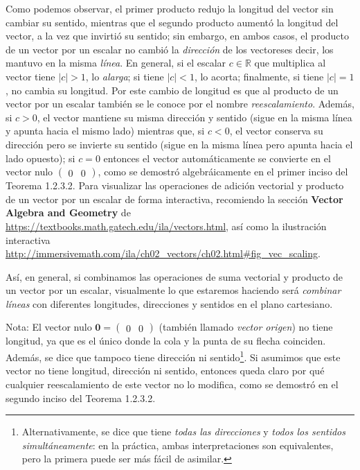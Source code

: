 \documentclass[12pt,dvipsnames]{article}
\begin{document}
    Como podemos observar, el primer producto redujo la longitud del vector sin cambiar su sentido, mientras que el segundo producto aumentó la longitud del vector, a la vez que invirtió su sentido; sin embargo, en ambos casos, el producto de un vector por un escalar no cambió la \emph{dirección} de los vectores\textemdash es decir, los mantuvo en la misma \emph{línea}. En general, si el escalar $c\in\mathbb{R}$ que multiplica al vector tiene $|c|>1$, lo \emph{alarga}; si tiene $|c|<1$, lo acorta; finalmente, si tiene $|c|=1$, no cambia su longitud. Por este cambio de longitud es que al producto de un vector por un escalar también se le conoce por el nombre \emph{reescalamiento}. Además, si $c>0$, el vector mantiene su misma dirección y sentido (sigue en la misma línea y apunta hacia el mismo lado) mientras que, si $c<0$, el vector conserva su dirección pero se invierte su sentido (sigue en la misma línea pero apunta hacia el lado opuesto); si $c=0$ entonces el vector automáticamente se convierte en el vector nulo $\begin{pmatrix}0&0\end{pmatrix}$, como se demostró algebráicamente en el primer inciso del Teorema 1.2.3.2. Para visualizar las operaciones de adición vectorial y producto de un vector por un escalar de forma interactiva, recomiendo la sección \textbf{Vector Algebra and Geometry} de \url{https://textbooks.math.gatech.edu/ila/vectors.html}, así como la ilustración interactiva \url{http://immersivemath.com/ila/ch02_vectors/ch02.html#fig_vec_scaling}.

    Así, en general, si combinamos las operaciones de suma vectorial y producto de un vector por un escalar, visualmente lo que estaremos haciendo será \emph{combinar líneas} con diferentes longitudes, direcciones y sentidos en el plano cartesiano. 

\vspace{3mm}

Nota: El vector nulo $\mathbf{0}=\begin{pmatrix}0&0\end{pmatrix}$ (también llamado \emph{vector origen}) no tiene longitud, ya que es el único donde la cola y la punta de su flecha coinciden. Además, se dice que tampoco tiene dirección ni sentido\footnote{Alternativamente, se dice que tiene \emph{todas las direcciones} y \emph{todos los sentidos simultáneamente}: en la práctica, ambas interpretaciones son equivalentes, pero la primera puede ser más fácil de asimilar.}. Si asumimos que este vector no tiene longitud, dirección ni sentido, entonces queda claro por qué cualquier reescalamiento de este vector no lo modifica, como se demostró en el segundo inciso del Teorema 1.2.3.2.
\end{document}
